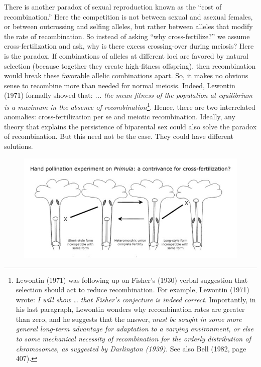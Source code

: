 \documentclass[
  letterpaper,
]{scrbook}
\begin{document}
There is another paradox of sexual reproduction known as the ``cost of
recombination.'' Here the competition is not between sexual and asexual
females, or between outcrossing and selfing alleles, but rather between
alleles that modify the rate of recombination. So instead of asking
``why cross-fertilize?'' we assume cross-fertilization and ask, why is
there excess crossing-over during meiosis? Here is the paradox. If
combinations of alleles at different loci are favored by natural
selection (because together they create high-fitness offspring), then
recombination would break these favorable allelic combinations apart.
So, it makes no obvious sense to recombine more than needed for normal
meiosis. Indeed, Lewontin (1971) formally showed that: \emph{... the
mean fitness of the population at equilibrium is a maximum in the
absence of recombination}\footnote{Lewontin (1971) was following up on
  Fisher's (1930) verbal suggestion that selection should act to reduce
  recombination. For example, Lewontin (1971) wrote: \emph{I will show
  \ldots{} that Fisher's conjecture is indeed correct}. Importantly, in
  his last paragraph, Lewontin wonders why recombination rates are
  greater than zero, and he suggests that the answer, \emph{must be
  sought in some more general long-term advantage for adaptation to a
  varying environment, or else to some mechanical necessity of
  recombination for the orderly distribution of chromosomes, as
  suggested by Darlington (1939).} See also Bell (1982, page 407).}.
Hence, there are two interrelated anomalies: cross-fertilization per se
and meiotic recombination. Ideally, any theory that explains the
persistence of biparental sex could also solve the paradox of
recombination. But this need not be the case. They could have different
solutions.

\begin{figure}


{\centering \includegraphics{images/fig1-3.jpg}

}

\end{figure}
\end{document}
